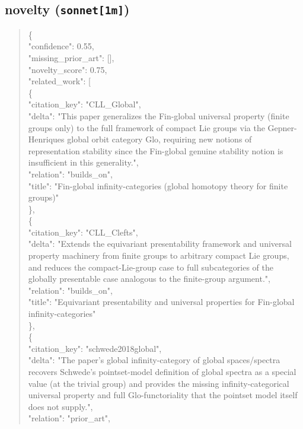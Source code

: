 \documentclass[11pt]{article}
\begin{document}
\subsection*{novelty (\texttt{sonnet[1m]})}
\begin{quote}\small\ttfamily\raggedright
\{\\
  "confidence": 0.55,\\
  "missing\_prior\_art": [],\\
  "novelty\_score": 0.75,\\
  "related\_work": [\\
    \{\\
      "citation\_key": "CLL\_Global",\\
      "delta": "This paper generalizes the Fin-global universal property (finite groups only) to the full framework of compact Lie groups via the Gepner-Henriques global orbit category Glo, requiring new notions of representation stability since the Fin-global genuine stability notion is insufficient in this generality.",\\
      "relation": "builds\_on",\\
      "title": "Fin-global infinity-categories (global homotopy theory for finite groups)"\\
    \},\\
    \{\\
      "citation\_key": "CLL\_Clefts",\\
      "delta": "Extends the equivariant presentability framework and universal property machinery from finite groups to arbitrary compact Lie groups, and reduces the compact-Lie-group case to full subcategories of the globally presentable case analogous to the finite-group argument.",\\
      "relation": "builds\_on",\\
      "title": "Equivariant presentability and universal properties for Fin-global infinity-categories"\\
    \},\\
    \{\\
      "citation\_key": "schwede2018global",\\
      "delta": "The paper's global infinity-category of global spaces/spectra recovers Schwede's pointset-model definition of global spectra as a special value (at the trivial group) and provides the missing infinity-categorical universal property and full Glo-functoriality that the pointset model itself does not supply.",\\
      "relation": "prior\_art",\\

\end{quote}
\end{document}
